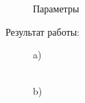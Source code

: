 \documentclass[14pt,a4paper,report]{report}
\begin{document}
\begin{figure}[h!]
\caption{Параметры}
\label{ris:image}
\end{figure}

Результат работы: 

\begin{figure}[h!]
\begin{minipage}[h]{0.47\linewidth}
 a) \\
\end{minipage}
\hfill
\begin{minipage}[h]{0.47\linewidth}
 \\b)

\end{minipage}
\end{figure}
\end{document}
